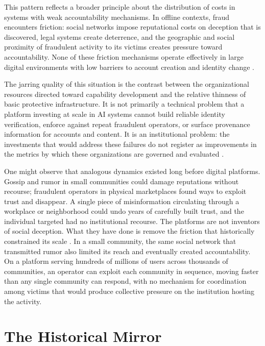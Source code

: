 \documentclass[12pt,a4paper]{article}
\begin{document}
This pattern reflects a broader principle about the distribution of costs in systems with weak
accountability mechanisms. In offline contexts, fraud encounters friction: social networks impose
reputational costs on deception that is discovered, legal systems create deterrence, and the
geographic and social proximity of fraudulent activity to its victims creates pressure toward
accountability. None of these friction mechanisms operate effectively in large digital environments
with low barriers to account creation and identity change \citep{boyd2014}.

The jarring quality of this situation is the contrast between the organizational resources
directed toward capability development and the relative thinness of basic protective
infrastructure. It is not primarily a technical problem that a platform investing at scale in AI
systems cannot build reliable identity verification, enforce against repeat fraudulent operators,
or surface provenance information for accounts and content. It is an institutional problem: the
investments that would address these failures do not register as improvements in the metrics by
which these organizations are governed and evaluated \citep{wu2016,zuboff2019}.

One might observe that analogous dynamics existed long before digital platforms. Gossip and
rumor in small communities could damage reputations without recourse; fraudulent operators in
physical marketplaces found ways to exploit trust and disappear. A single piece of misinformation
circulating through a workplace or neighborhood could undo years of carefully built trust, and
the individual targeted had no institutional recourse. The platforms are not inventors of social
deception. What they have done is remove the friction that historically constrained its scale
\citep{boyd2014}. In a small community, the same social network that transmitted rumor also
limited its reach and eventually created accountability. On a platform serving hundreds of
millions of users across thousands of communities, an operator can exploit each community in
sequence, moving faster than any single community can respond, with no mechanism for coordination
among victims that would produce collective pressure on the institution hosting the activity.

\section{The Historical Mirror}
\end{document}
